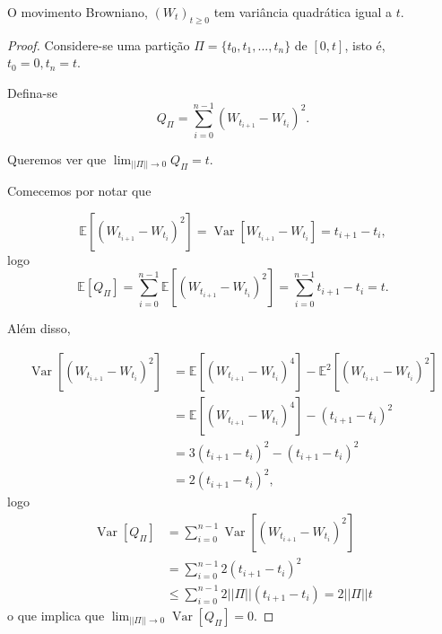 \documentclass{article}
\begin{document}
\vspace{0.5cm}

\begin{prop}
    O movimento Browniano, $(W_t)_{t \geq 0}$ tem variância quadrática igual a $t$.
\end{prop}


\begin{proof}
    Considere-se uma partição  $\Pi=\{t_0,t_1,...,t_n\}$ de $[0,t]$, isto é, $t_0=0,t_n=t$.
    
    Defina-se $$Q_\Pi= \sum_{i=0}^{n-1}(W_{t_{i+1}}-W_{t_i})^2.$$

    Queremos ver que $\lim_{||\Pi|| \rightarrow 0}Q_\Pi=t$.

    Comecemos por notar que

    \begin{equation*}
        \mathbb{E}[(W_{t_{i+1}}-W_{t_i})^2]=\operatorname{Var}[W_{t_{i+1}}-W_{t_i}]=t_{i+1}-t_i,
    \end{equation*}
    logo 
    \begin{equation*}
        \mathbb{E}[Q_\Pi]= \sum_{i=0}^{n-1}\mathbb{E}[(W_{t_{i+1}}-W_{t_i})^2]=\sum_{i=0}^{n-1}t_{i+1}-t_i=t.
    \end{equation*}

    Além disso,

    \begin{align*}
        \operatorname{Var}[(W_{t_{i+1}}-W_{t_i})^2]&=\mathbb{E}[(W_{t_{i+1}}-W_{t_i})^4]-\mathbb{E}^2[(W_{t_{i+1}}-W_{t_i})^2]\\
                                                   &=\mathbb{E}[(W_{t_{i+1}}-W_{t_i})^4]-(t_{i+1}-t_i)^2\\
                                                   &=3(t_{i+1}-t_i)^2-(t_{i+1}-t_i)^2\\
                                                   &=2(t_{i+1}-t_i)^2,
    \end{align*}
    logo
    \begin{align*}
        \operatorname{Var}[Q_\Pi]&=\sum_{i=0}^{n-1}\operatorname{Var}[(W_{t_{i+1}}-W_{t_i})^2]\\
                                 &=\sum_{i=0}^{n-1}2(t_{i+1}-t_i)^2\\
                                 &\leq \sum_{i=0}^{n-1}2||\Pi||(t_{i+1}-t_i)=2||\Pi||t                                 
    \end{align*}
    o que implica que $\lim_{||\Pi|| \rightarrow 0}\operatorname{Var}[Q_\Pi]=0$.
    \vspace{0.5cm}


\end{proof}
\end{document}
